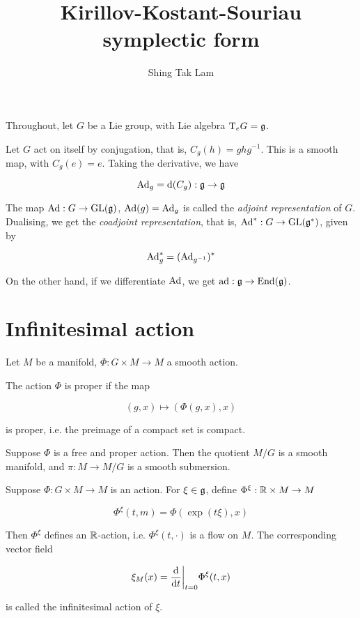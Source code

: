 \documentclass{article}
\title{Kirillov-Kostant-Souriau symplectic form}
\author{Shing Tak Lam}
\begin{document}
\maketitle

Throughout, let \(G\) be a Lie group, with Lie algebra \(\mathrm{T}_eG = \mathfrak{g}\).

Let \(G\) act on itself by conjugation, that is, \(C_g(h) = ghg^{-1}\). This is a smooth map, with \(C_g(e) = e\). Taking the derivative, we have

\[\operatorname{Ad}_g = \dd (C_g) : \mathfrak{g} \to \mathfrak{g}\]

The map \(\operatorname{Ad} : G \to \operatorname{GL}(\mathfrak{g})\), \(\operatorname{Ad}(g) = \operatorname{Ad}_g\) is called the \emph{adjoint representation} of \(G\). Dualising, we get the \emph{coadjoint representation}, that is, \(\operatorname{Ad}^* : G \to \operatorname{GL}(\mathfrak{g}^*)\), given by

\[\operatorname{Ad}^*_g = (\operatorname{Ad}_{g^{-1}})^*\]

On the other hand, if we differentiate \(\operatorname{Ad}\), we get \(\operatorname{ad} : \mathfrak{g} \to \operatorname{End}(\mathfrak{g})\).

\section{Infinitesimal action}

Let \(M\) be a manifold, \(\Phi : G \times M \to M\) a smooth action.

\begin{definition}
     The action \(\Phi\) is proper if the map

    \[(g, x) \mapsto (\Phi(g, x), x)\]

    is proper, i.e. the preimage of a compact set is compact.
\end{definition}

\begin{proposition}
    Suppose \(\Phi\) is a free and proper action. Then the quotient \(M/G\) is a smooth manifold, and \(\pi : M \to M/G\) is a smooth submersion.
\end{proposition}

\begin{definition}
     Suppose \(\Phi : G \times M \to M\) is an action. For \(\xi \in \mathfrak{g}\), define \(\Phi^\xi : \mathbb{R} \times M \to M\)

    \[\Phi^\xi(t, m) = \Phi(\exp(t\xi), x)\]

    Then \(\Phi^\xi\) defines an \(\mathbb{R}\)-action, i.e. \(\Phi^\xi(t, \cdot)\) is a flow on \(M\). The corresponding vector field

    \[\xi_M(x) = \dv{t}\bigg\vert_{t = 0} \Phi^\xi(t, x)\]

    is called the infinitesimal action of \(\xi\).
\end{definition}
\end{document}
